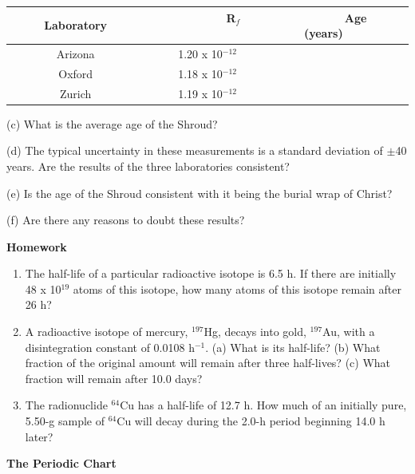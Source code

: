 \vspace{0.3cm}
{\centering \begin{tabular}{|c|c|c|}
\hline 
~~~~~Laboratory~~~~~&
~~~~~~~~R\( _{f} \)~~~~~~~~&
~~~~~Age (years)~~~~~\\
\hline
\hline 
Arizona&
1.20 x 10\( ^{-12} \)&
\\
\hline 
Oxford&
1.18 x 10\( ^{-12} \)&
\\
\hline 
Zurich&
1.19 x 10\( ^{-12} \)&
\\
\hline
\end{tabular}\par}
\vspace{0.3cm}

\answerspace{3.5in}
(c) What is the average age of the Shroud? 
\answerspace{1in}

(d) The typical uncertainty in these measurements is a standard deviation
of \( \pm  \)40 years. Are the results of the three laboratories
consistent? 
\answerspace{1in}

\pagebreak
(e) Is the age of the Shroud consistent with it being the burial wrap
of Christ? 
\vspace{1in}

(f) Are there any reasons to doubt these results?
\vspace{1in}

\textbf{Homework} 

\begin{enumerate}
\item The half-life of a particular radioactive isotope is 6.5 h. If there
are initially 48 x 10\( ^{19} \) atoms of this isotope, how many
atoms of this isotope remain after 26 h? 
\item A radioactive isotope of mercury, \( ^{197} \)Hg, decays into gold,
\( ^{197} \)Au, with a disintegration constant of 0.0108 h\( ^{-1} \).
(a) What is its half-life? (b) What fraction of the original amount
will remain after three half-lives? (c) What fraction will remain
after 10.0 days?
\item The radionuclide \( ^{64} \)Cu has a half-life of 12.7 h. How much
of an initially pure, 5.50-g sample of \( ^{64} \)Cu will decay during
the 2.0-h period beginning 14.0 h later? 
\end{enumerate}

\textbf{The Periodic Chart} 

